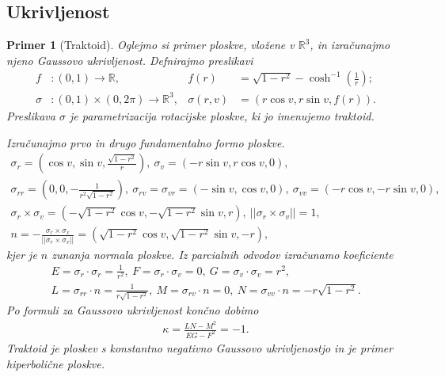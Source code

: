 \documentclass[a4paper]{article}
\newtheorem{primer}{Primer}
\begin{document}
\subsection{Ukrivljenost}

\begin{primer}[Traktoid]
Oglejmo si primer ploskve, vložene v $\mathbb{R}^{3}$, in izračunajmo njeno Gaussovo ukrivljenost.
Defnirajmo preslikavi
\begin{align*}
f &\colon (0,1) \to \mathbb{R}, &f(r) &= \sqrt{1-r^2} - \cosh ^{-1} \left(\frac{1}{r} \right); \\
\sigma &\colon (0,1) \times (0,2\pi) \to \mathbb{R}^{3}, &\sigma(r,v) &= (r \cos{v}, r \sin{v}, f(r)).
\end{align*}
Preslikava $\sigma$ je parametrizacija rotacijske ploskve, ki jo imenujemo \emph{traktoid}.

Izračunajmo prvo in drugo fundamentalno formo ploskve.
\begin{gather*}
\sigma_{r} = \left(\cos{v}, \sin{v}, \frac{\sqrt{1-r^2}}{r} \right), \  \sigma_{v} = \left(-r \sin{v}, r \cos{v}, 0 \right), \\
\sigma_{rr} = \left(0, 0, -\frac{1}{r^2 \sqrt{1-r^2}} \right), \  \sigma_{rv} = \sigma_{vr} = (-\sin{v}, \cos{v}, 0), \  \sigma_{vv} = (-r\cos{v}, -r\sin{v}, 0), \\
\sigma_{r} \times \sigma_{v} = \left(-\sqrt{1-r^2}\cos{v}, -\sqrt{1-r^2}\sin{v}, r \right), \  ||\sigma_{r} \times \sigma_{v}|| = 1, \\
n = -\frac{\sigma_{r} \times \sigma_{v}}{||\sigma_{r} \times \sigma_{v}||} = \left(\sqrt{1-r^2}\cos{v}, \sqrt{1-r^2}\sin{v}, -r \right),
\end{gather*}
kjer je $n$ zunanja normala ploskve. Iz parcialnih odvodov izračunamo koeficiente
\begin{gather*}
E = \sigma_{r} \cdot \sigma_{r} = \frac{1}{r^2}, \ F = \sigma_{r} \cdot \sigma_{v} = 0, \ G = \sigma_{v} \cdot \sigma_{v} = r^2, \\
L = \sigma_{rr} \cdot n = \frac{1}{r\sqrt{1-r^2}}, \ M = \sigma_{rv} \cdot n = 0, \ N = \sigma_{vv} \cdot n = -r\sqrt{1-r^2}.
\end{gather*}
Po formuli za Gaussovo ukrivljenost končno dobimo
\begin{gather*}
\kappa = \frac{LN-M^2}{EG-F^2} = -1.
\end{gather*}
Traktoid je ploskev s konstantno negativno Gaussovo ukrivljenostjo in je primer hiperbolične ploskve.
\end{primer}
\end{document}
